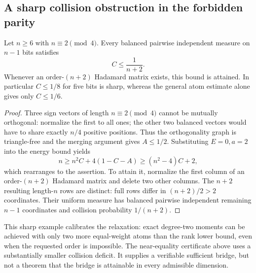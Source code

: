 \subsection{A sharp collision obstruction in the forbidden parity}
\begin{proposition}
\label{prop:discrete-parity-collision}
Let $n\ge6$ with $n\equiv2\pmod4$. Every balanced pairwise independent
measure on $n-1$ bits satisfies
\[
 C\le\frac1{n+2}.
\]
Whenever an order-$(n+2)$ Hadamard matrix exists, this bound is attained.
In particular $C\le1/8$ for five bits is sharp, whereas the general
atom estimate alone gives only $C\le1/6$.
\end{proposition}
\begin{proof}
Three sign vectors of length $n\equiv2\pmod4$ cannot be mutually
orthogonal: normalize the first to all ones; the other two balanced
vectors would have to share exactly $n/4$ positive positions.
Thus the orthogonality graph is triangle-free and the merging argument
gives $A\le1/2$. Substituting $E=0,a=2$ into the energy bound yields
\[
 n\ge n^2C+4(1-C-A)\ge(n^2-4)C+2,
\]
which rearranges to the assertion. To attain it, normalize the first
column of an order-$(n+2)$ Hadamard matrix and delete two other columns.
The $n+2$ resulting length-$n$ rows are distinct: full rows differ in
$(n+2)/2>2$ coordinates. Their uniform measure has balanced pairwise
independent remaining $n-1$ coordinates and collision probability
$1/(n+2)$.
\end{proof}
This sharp example calibrates the relaxation: exact degree-two moments
can be achieved with only two more equal-weight atoms than the
rank lower bound, even when the requested order is impossible. The
near-equality certificate above uses a substantially smaller collision
deficit. It supplies a verifiable sufficient bridge, but not a theorem
that the bridge is attainable in every admissible dimension.



